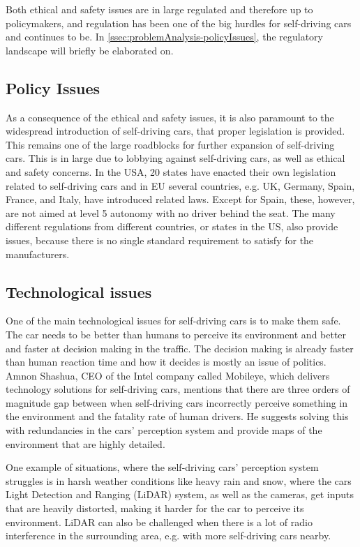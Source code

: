 Both ethical and safety issues are in large regulated and therefore up to policymakers, and regulation has been one of the big hurdles for self-driving cars and continues to be.
In \autoref{ssec:problemAnalysis-policyIssues}, the regulatory landscape will briefly be elaborated on.

\subsection{Policy Issues}\label{ssec:problemAnalysis-policyIssues}
As a consequence of the ethical and safety issues, it is also paramount to the widespread introduction of self-driving cars, that proper legislation is provided.
This remains one of the large roadblocks for further expansion of self-driving cars.
This is in large due to lobbying against self-driving cars, as well as ethical and safety concerns.
In the USA, 20 states have enacted their own legislation related to self-driving cars and in EU several countries, e.g. UK, Germany, Spain, France, and Italy, have introduced related laws.
Except for Spain, these, however, are not aimed at level 5 autonomy with no driver behind the seat.
The many different regulations from different countries, or states in the US, also provide issues, because there is no single standard requirement to satisfy for the manufacturers.
\cite{walker_av-regulation-us_2019, autovista_av-regulation-eu_2019}

\subsection{Technological issues}\label{ssec:problemAnalysis-techIssues}
One of the main technological issues for self-driving cars is to make them safe.
The car needs to be better than humans to perceive its environment and better and faster at decision making in the traffic.
The decision making is already faster than human reaction time and how it decides is mostly an issue of politics.
Amnon Shashua, CEO of the Intel company called Mobileye, which delivers technology solutions for self-driving cars, mentions that there are three orders of magnitude gap between when self-driving cars incorrectly perceive something in the environment and the fatality rate of human drivers.
He suggests solving this with redundancies in the cars' perception system and provide maps of the environment that are highly detailed.
\cite{hao_three-tech-issues_2019}

One example of situations, where the self-driving cars' perception system struggles is in harsh weather conditions like heavy rain and snow, where the cars Light Detection and Ranging (LiDAR) system, as well as the cameras, get inputs that are heavily distorted, making it harder for the car to perceive its environment.
LiDAR can also be challenged when there is a lot of radio interference in the surrounding area, e.g. with more self-driving cars nearby.
\cite{aberdeen_tech-issues_2018}

